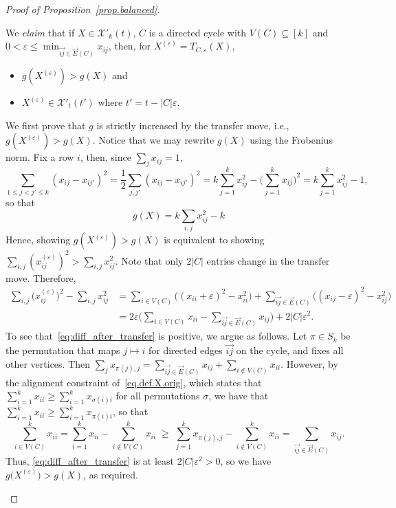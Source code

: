\documentclass[a4paper,UKenglish,cleveref, autoref, thm-restate,numberwithinsect]{lipics-v2021}
\newcommand{\cX}{\mathcal{X}}
\newcommand{\eps}{\varepsilon}
\begin{document}
\begin{proof}[Proof of Proposition~\ref{prop.balanced}]
\begin{claim}\label{clm.ginc_stillvalid}
    We \emph{claim} that if $X\in \cX'_k(t)$, $C$ is a directed cycle with $V(C)\subseteq [k]$ and $0< \eps \leq \min_{\vec{ij}\in \vec{E}(C)} x_{ij}$, then, for $X^{(\eps)}=T_{C,\eps}(X)$,
    \begin{itemize}
        \item $g(X^{(\eps)})>g(X)$ and
        \item $X^{(\eps)}\in \cX'_t(t')$ where $t'=t-|C|\eps$.
    \end{itemize}
\end{claim}
\begin{claimproof}
We first prove that $g$ is strictly increased by the transfer move, i.e., $g(X^{(\eps)})>g(X)$. Notice that we may rewrite $g(X)$ using the Frobenius norm. Fix a row $i$, then, since $\sum_j x_{ij}=1$,
\[
\sum_{1\le j<j'\le k} (x_{ij}-x_{ij'})^2
=\frac12\sum_{j,j'}(x_{ij}-x_{ij'})^2
= k\sum_{j=1}^k x_{ij}^2 -\Big(\sum_{j=1}^k x_{ij}\Big)^2
= k\sum_{j=1}^k x_{ij}^2 - 1,
\]
so that
\begin{equation}
\label{eq:g_frob_bal}
g(X)
= k\sum_{i,j} x_{ij}^2 -k 
\end{equation}
Hence, showing $g(X^{(\eps)})>g(X)$ is equivalent to showing $\sum_{i,j}(x^{(\eps)}_{ij})^2> \sum_{i,j}x_{ij}^2$.
Note that only $2|C|$ entries change in the transfer move. Therefore,
\begin{align}
\nonumber
% 
\sum_{i,j} \big(x^{(\varepsilon)}_{ij}\big)^2 - \sum_{i,j} x_{ij}^2 %
&= \sum_{i \in V(C)} \Big((x_{ii}+\varepsilon)^2-x_{ii}^2\Big)
   +\sum_{\vec{ij}\in \vec{E}(C)} \Big((x_{ij}-\varepsilon)^2-x_{ij}^2\Big)\\
&= 2\varepsilon\Big(\sum_{i \in V(C)} x_{ii} - \sum_{\vec{ij}\in \vec{E}(C)} x_{ij}\Big) + 2|C|\varepsilon^2.\label{eq:diff_after_transfer}
\end{align}
To see that~\eqref{eq:diff_after_transfer} is positive, we argue as follows. Let $\pi\in S_k$ be the permutation that maps $j\mapsto i$ for directed edges $\vec{ij}$ on the cycle, and fixes all other vertices.
Then $\sum_j x_{\pi(j),j}=\sum_{\vec{ij}\in \vec{E}(C)}  x_{ij} + \sum_{i\notin V(C)}x_{ii}$.
However, by the alignment constraint of~\eqref{eq.def.X.orig}, which states that $\sum_{i=1}^k x_{ii} \geq \sum_{i=1}^k x_{\sigma(i)i}$ for all permutations $\sigma$, we have that
$\sum_{i=1}^k x_{ii} \geq \sum_{i=1}^k x_{\pi(i)i}$, so that
\[
\sum_{i\in V(C)}^k x_{ii} = \sum_{i=1}^k x_{ii} - \sum_{i\notin V(C)}^k x_{ii}  \;\ge\; \sum_{j=1}^k x_{\pi(j),j} - \sum_{i\notin V(C)}^k x_{ii} = \sum_{\vec{ij}\in \vec{E}(C)}  x_{ij}.
\]
Thus, \eqref{eq:diff_after_transfer} is at least $2|C|\eps^2>0$, so we have $g\big(X^{(\varepsilon)}\big) > g(X)$, as required.
    





\end{claimproof}
\end{proof}
\end{document}
